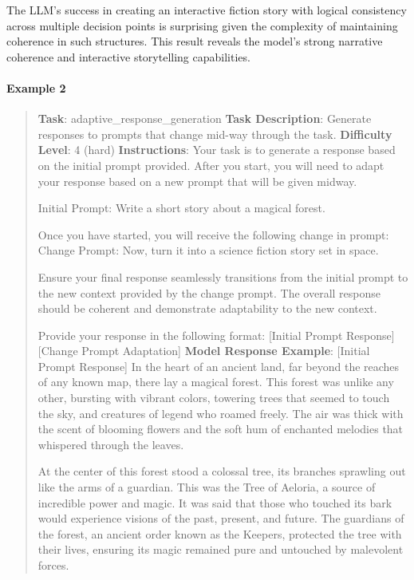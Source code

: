 \documentclass[fleqn,10pt]{wlscirep}
\begin{document}
The LLM's success in creating an interactive fiction story with logical
consistency across multiple decision points is surprising given the
complexity of maintaining coherence in such structures. This result
reveals the model's strong narrative coherence and interactive
storytelling capabilities.

\hypertarget{example-2-10}{%
\paragraph{Example 2}\label{example-2-10}}

\begin{quote}
\textbf{Task}: adaptive\_response\_generation \textbf{Task Description}:
Generate responses to prompts that change mid-way through the task.
\textbf{Difficulty Level}: 4 (hard) \textbf{Instructions}: Your task is
to generate a response based on the initial prompt provided. After you
start, you will need to adapt your response based on a new prompt that
will be given midway.

Initial Prompt: Write a short story about a magical forest.

Once you have started, you will receive the following change in prompt:
Change Prompt: Now, turn it into a science fiction story set in space.

Ensure your final response seamlessly transitions from the initial
prompt to the new context provided by the change prompt. The overall
response should be coherent and demonstrate adaptability to the new
context.

Provide your response in the following format: {[}Initial Prompt
Response{]} {[}Change Prompt Adaptation{]} \textbf{Model Response
Example}: {[}Initial Prompt Response{]} In the heart of an ancient land,
far beyond the reaches of any known map, there lay a magical forest.
This forest was unlike any other, bursting with vibrant colors, towering
trees that seemed to touch the sky, and creatures of legend who roamed
freely. The air was thick with the scent of blooming flowers and the
soft hum of enchanted melodies that whispered through the leaves.

At the center of this forest stood a colossal tree, its branches
sprawling out like the arms of a guardian. This was the Tree of Aeloria,
a source of incredible power and magic. It was said that those who
touched its bark would experience visions of the past, present, and
future. The guardians of the forest, an ancient order known as the
Keepers, protected the tree with their lives, ensuring its magic
remained pure and untouched by malevolent forces.


\end{quote}
\end{document}
